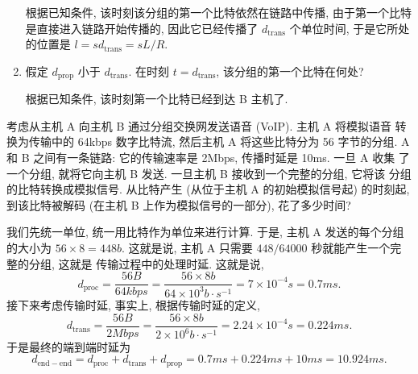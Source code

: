 \documentclass[10pt,UTF8]{book} %
\begin{document}
\begin{example}
\begin{enumerate}[label={$\left.\mathrm{\alph*}\right)$}, itemsep=0pt]
\begin{sol}
            根据已知条件, 该时刻该分组的第一个比特依然在链路中传播,
            由于第一个比特是直接进入链路开始传播的, 因此它已经传播了
            $d_\mathrm{trans}$ 个单位时间, 于是它所处的位置是
            $l = sd_\mathrm{trans} = sL/R$.
        \end{sol}
        \item 假定 $d_\mathrm{prop}$ 小于 $d_\mathrm{trans}$. 
        在时刻 $t = d_\mathrm{trans}$, 该分组的第一个比特在何处?
        \begin{sol}
            根据已知条件, 该时刻第一个比特已经到达 B 主机了.
        \end{sol}
    \end{enumerate}
\end{example}

\begin{example}
    考虑从主机 A 向主机 B 通过分组交换网发送语音 (VoIP). 主机 A 将模拟语音
    转换为传输中的 64kbps 数字比特流, 然后主机 A 将这些比特分为 56 字节的分组.
    A 和 B 之间有一条链路: 它的传输速率是 2Mbps, 传播时延是 10ms. 一旦 A 收集
    了一个分组, 就将它向主机 B 发送. 一旦主机 B 接收到一个完整的分组, 它将该
    分组的比特转换成模拟信号. 从比特产生 (从位于主机 A 的初始模拟信号起) 的时刻起,
    到该比特被解码 (在主机 B 上作为模拟信号的一部分), 花了多少时间?
    \begin{sol}
        我们先统一单位, 统一用比特作为单位来进行计算. 于是, 主机 A 发送的每个分组
        的大小为 $56 \times 8 = 448\si{b}$.
        这就是说, 主机 A 只需要 $448/64000$ 秒就能产生一个完整的分组, 这就是
        传输过程中的处理时延. 这就是说,
        \[ d_\mathrm{proc} 
        = \dfrac{56\si{B}}{64 \si{kbps}}
        = \dfrac{56 \times 8 \si{b}}{64 \times 10^3 \si{b \cdot s^{-1}}}
        = 7 \times 10^{-4} \si{s} =0.7 \si{ms}. \]
        \newline 接下来考虑传输时延, 事实上, 根据传输时延的定义,
        \[ d_\mathrm{trans} 
        = \dfrac{56\si{B}}{2\si{Mbps}}
        = \dfrac{56 \times 8 \si{b}}{2 \times 10^6 \si{b \cdot s^{-1}}}
        = 2.24 \times 10^{-4} \si{s} = 0.224 \si{ms}. \]
        \newline 于是最终的端到端时延为
        \[ d_\mathrm{end-end} = d_\mathrm{proc} + d_\mathrm{trans} +
        d_\mathrm{prop} = 0.7\si{ms} + 0.224 \si{ms} + 10\si{ms}
        = 10.924 \si{ms}. \]
    \end{sol}
\end{example}
\end{document}
